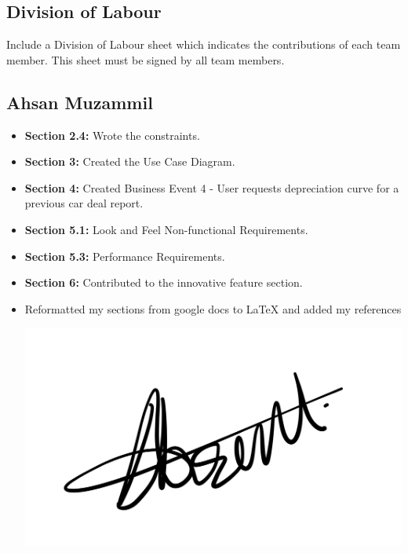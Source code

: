 \documentclass[]{article}
\begin{document}
\begin{enumerate}
\appendix
\section{Division of Labour}
\label{sec:division_of_labour}
Include a Division of Labour sheet which indicates the contributions of each team member. This sheet must be signed by all team members.

\subsection{Ahsan Muzammil}

\begin{itemize}
    \item \textbf{Section 2.4:} Wrote the constraints.
    \item \textbf{Section 3:} Created the Use Case Diagram.
    \item \textbf{Section 4:} Created Business Event 4 - User requests depreciation curve for a previous car deal report.
    \item \textbf{Section 5.1:} Look and Feel Non-functional Requirements.
    \item \textbf{Section 5.3:} Performance Requirements.
    \item \textbf{Section 6:} Contributed to the innovative feature section.
    \item Reformatted my sections from google docs to LaTeX and added my references
	\begin{center}
        \includegraphics[scale=0.1]{Images/ahsan.jpeg}
    \end{center}
\end{itemize}




\end{enumerate}
\end{document}
